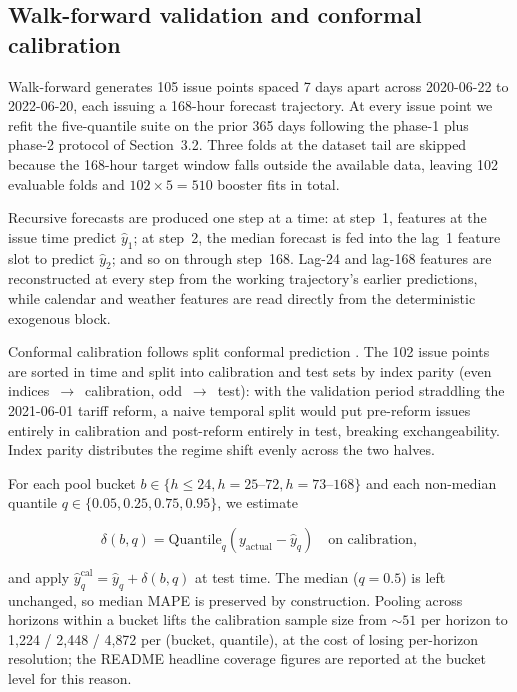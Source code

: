 \documentclass[11pt]{article}
\begin{document}
\subsection{Walk-forward validation and conformal calibration}

Walk-forward generates 105 issue points spaced 7 days apart across
2020-06-22 to 2022-06-20, each issuing a 168-hour forecast trajectory.
At every issue point we refit the five-quantile suite on the prior 365
days following the phase-1 plus phase-2 protocol of Section~3.2. Three
folds at the dataset tail are skipped because the 168-hour target window
falls outside the available data, leaving 102 evaluable folds and
$102 \times 5 = 510$ booster fits in total.

Recursive forecasts are produced one step at a time: at step~1, features
at the issue time predict $\hat{y}_1$; at step~2, the median forecast is
fed into the lag~1 feature slot to predict $\hat{y}_2$; and so on
through step~168. Lag-24 and lag-168 features are reconstructed at every
step from the working trajectory's earlier predictions, while calendar
and weather features are read directly from the deterministic
exogenous block.

Conformal calibration follows split conformal prediction
\citep{vovk2005, shafer2008}. The 102 issue points are sorted in time and
split into calibration and test sets by index parity (even
indices~$\to$~calibration, odd~$\to$~test): with the validation period
straddling the 2021-06-01 tariff reform, a naive temporal split would put
pre-reform issues entirely in calibration and post-reform entirely in
test, breaking exchangeability. Index parity distributes the regime shift
evenly across the two halves.

For each pool bucket
$b \in \{\text{$h \leq 24$}, \text{$h = 25\text{--}72$}, \text{$h = 73\text{--}168$}\}$
and each non-median quantile $q \in \{0.05, 0.25, 0.75, 0.95\}$, we
estimate

\[
\delta(b, q) = \mathrm{Quantile}_q\!\left(
y_{\text{actual}} - \hat{y}_q
\right) \quad \text{on calibration},
\]

and apply $\hat{y}_q^{\text{cal}} = \hat{y}_q + \delta(b, q)$ at test
time. The median ($q = 0.5$) is left unchanged, so median MAPE is preserved
by construction. Pooling across horizons within a bucket lifts the
calibration sample size from $\sim 51$ per horizon to 1{,}224 / 2{,}448 /
4{,}872 per (bucket, quantile), at the cost of losing per-horizon
resolution; the README headline coverage figures are reported at the
bucket level for this reason.
\end{document}
